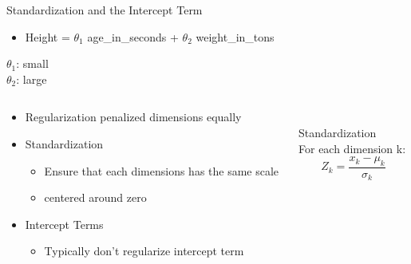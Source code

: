 \documentclass[aspectratio=169]{../latex_main/tntbeamer}  %
\begin{document}
	
	\begin{frame}{Standardization and the Intercept Term}
	    \begin{itemize}
	        \item Height = $\theta_1$ age\_in\_seconds + $\theta_2$ weight\_in\_tons
	    \end{itemize}
	    $\theta_1$: small\\
	    $\theta_2$: large
	    \begin{columns}
	        \begin{column}{.5\textwidth}
	                \begin{itemize}
	                    \item Regularization penalized dimensions equally
	                    \item Standardization
	                    \begin{itemize}
	                        \item Ensure that each dimensions has the same scale
	                        \item centered around zero
	                    \end{itemize}
	                    \item Intercept Terms
	                    \begin{itemize}
	                        \item Typically don’t regularize intercept term 
	                    \end{itemize}
	                \end{itemize}
	        \end{column}
	        
	        \begin{column}{.5\textwidth}
	                \\ 
	                Standardization\\
	                For each dimension k:
	                \begin{equation*}
	                    Z_k = \frac{x_k - \mu_k}{\sigma_k}
	                \end{equation*}
	        \end{column}
	    \end{columns}
	\end{frame}
	
\end{document}
